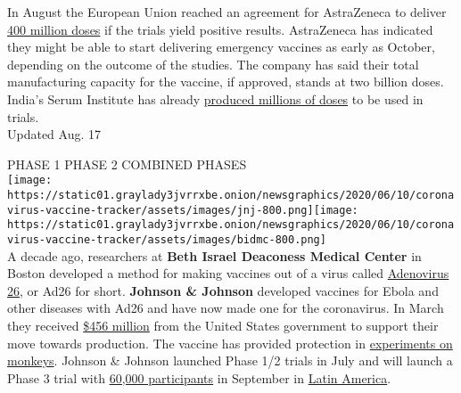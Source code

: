 In August the European Union reached an agreement for AstraZeneca to
deliver
\href{https://www.astrazeneca.com/content/astraz/media-centre/press-releases/2020/astrazeneca-concludes-agreement-with-the-european-commission-for-the-supply-of-up-to-400-million-doses-of-azd1222-covid-19-vaccine.html}{400
million doses} if the trials yield positive results. AstraZeneca has
indicated they might be able to start delivering emergency vaccines as
early as October, depending on the outcome of the studies. The company
has said their total manufacturing capacity for the vaccine, if
approved, stands at two billion doses. India's Serum Institute has
already
\href{https://www.nytimes3xbfgragh.onion/2020/08/01/world/asia/coronavirus-vaccine-india.html}{produced
millions of doses} to be used in trials.\\
Updated Aug. 17

PHASE 1 PHASE 2 COMBINED PHASES\\
\texttt{[image: https://static01.graylady3jvrrxbe.onion/newsgraphics/2020/06/10/coronavirus-vaccine-tracker/assets/images/jnj-800.png]}\texttt{[image: https://static01.graylady3jvrrxbe.onion/newsgraphics/2020/06/10/coronavirus-vaccine-tracker/assets/images/bidmc-800.png]}\\
A decade ago, researchers at \textbf{Beth Israel Deaconess Medical
Center} in Boston developed a method for making vaccines out of a virus
called
\href{https://www.nytimes3xbfgragh.onion/2020/07/17/health/coronavirus-vaccine-johnson-janssen.html}{Adenovirus
26}, or Ad26 for short. \textbf{Johnson \& Johnson} developed vaccines
for Ebola and other diseases with Ad26 and have now made one for the
coronavirus. In March they received
\href{https://www.jnj.com/johnson-johnson-announces-a-lead-vaccine-candidate-for-covid-19-landmark-new-partnership-with-u-s-department-of-health-human-services-and-commitment-to-supply-one-billion-vaccines-worldwide-for-emergency-pandemic-use}{\$456
million} from the United States government to support their move towards
production. The vaccine has provided protection in
\href{https://www.nytimes3xbfgragh.onion/2020/07/30/health/covid-19-vaccine-monkeys.html}{experiments
on monkeys}. Johnson \& Johnson launched Phase 1/2 trials in July and
will launch a Phase 3 trial with
\href{https://clinicaltrials.gov/ct2/show/NCT04505722?term=vaccine\&recrs=abdf\&cond=COVID-19\&phase=0123\&sort=nwst\&draw=2\&rank=11}{60,000
participants} in September in
\href{https://www.reuters.com/article/us-health-coronavirus-chile-vaccine-idUSKBN25M297}{Latin
America}.

